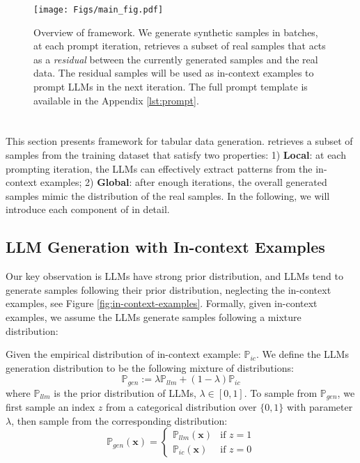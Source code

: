 \begin{figure*}[t!]
  \centering
  \texttt{[image: Figs/main\_fig.pdf]}
  \caption{Overview of \modelname framework. We generate synthetic samples in batches, at each prompt iteration, \modelname retrieves a subset of real samples that acts as a \textit{residual} between the currently generated samples and the real data. The residual samples will be used as in-context examples to prompt LLMs in the next iteration. The full prompt template is available in the Appendix \ref{lst:prompt}.}
  \label{fig:overview}
\end{figure*}


\section{\modelname}
\label{method}
This section presents \modelname framework for tabular data generation. \modelname retrieves a subset of samples from the training dataset that satisfy two properties: 1) \textbf{Local}: at each prompting iteration, the LLMs can effectively extract patterns from the in-context examples; 2) \textbf{Global}: after enough iterations, the overall generated samples mimic the distribution of the real samples. In the following, we will introduce each component of \modelname in detail.

\subsection{LLM Generation with In-context Examples}
Our key observation is LLMs have strong prior distribution, and LLMs tend to generate samples following their prior distribution, neglecting the in-context examples, see Figure \ref{fig:in-context-examples}. Formally, given in-context examples, we assume the LLMs generate samples following a mixture distribution:
\begin{definition} \label{def:gen_dist}
Given the empirical distribution of in-context example: $\mathbb{P}_{ic}$. We define the LLMs generation distribution to be the following mixture of distributions:
\begin{equation} \label{eq:gen_dist}
\mathbb{P}_{gen} := \lambda \mathbb{P}_{llm} + (1-\lambda) \mathbb{P}_{ic}
\end{equation}
where $\mathbb{P}_{llm}$ is the prior distribution of LLMs, 
$\lambda\in[0,1]$. To sample from $\mathbb{P}_{gen}$, we first sample an index $z$ from a categorical distribution over $\{0,1\}$ with parameter $\lambda$, then sample from the corresponding distribution: 
\begin{equation} \nonumber
  \mathbb{P}_{gen}(\boldsymbol{x}) = \begin{cases} 
    \mathbb{P}_{llm}(\boldsymbol{x}) & \text{if } z = 1 \\
    \mathbb{P}_{ic}(\boldsymbol{x}) & \text{if } z = 0 
  \end{cases}
\end{equation} 
\end{definition}

